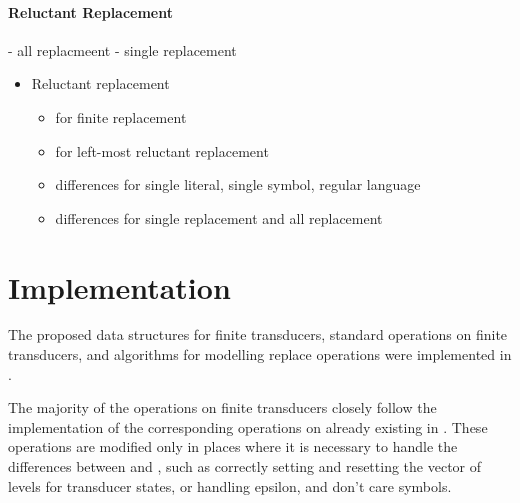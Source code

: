 \subsubsection{Reluctant Replacement \nft}
- all replacmeent
- single replacement






\begin{itemize}
  \item Reluctant replacement~\cite{replace_nfts_model_ModelingRegularReplacementForStringConstraintSolving_DBLP:conf/nfm/FuL10}
  \begin{itemize}
    \item \dfts for finite replacement
    \item \nfts for left-most reluctant replacement
    \item differences for single literal, single symbol, regular language
    \item differences for single replacement and all replacement
  \end{itemize}
\end{itemize}

\chapter{Implementation}

The proposed data structures for finite transducers, standard operations on finite transducers, and algorithms for modelling replace operations were implemented in \mata.

The majority of the operations on finite transducers closely follow the implementation of the corresponding operations on \nfas already existing in \mata.
These operations are modified only in places where it is necessary to handle the differences between \nfas and \nfts, such as correctly setting and resetting the vector of levels for transducer states, or handling epsilon, \nop and don't care symbols.

